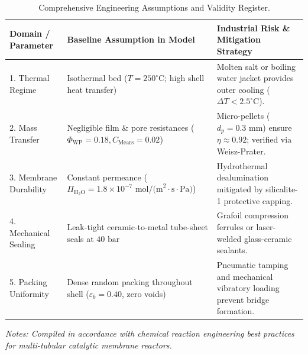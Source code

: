 \documentclass[12pt,a4paper]{article}
\begin{document}
\begin{table}[htbp]
\centering
\caption{Comprehensive Engineering Assumptions and Validity Register.}
\label{tab:assumptions}
\begin{tabular*}{\textwidth}{@{\extracolsep{\fill}}lll@{}}
\toprule
\textbf{Domain / Parameter} & \textbf{Baseline Assumption in Model} & \textbf{Industrial Risk \& Mitigation Strategy} \\
\midrule
1. Thermal Regime & Isothermal bed ($T = 250^\circ\text{C}$; high shell heat transfer) & Molten salt or boiling water jacket provides outer cooling ($\Delta T < 2.5^\circ\text{C}$). \\
2. Mass Transfer & Negligible film \& pore resistances ($\Phi_{\text{WP}} = 0.18, C_{\text{Mears}} = 0.02$) & Micro-pellets ($d_p = 0.3\text{ mm}$) ensure $\eta \approx 0.92$; verified via Weisz-Prater. \\
3. Membrane Durability & Constant permeance ($\Pi_{\text{H}_2\text{O}} = 1.8 \times 10^{-7}\text{ mol/(m}^2\cdot\text{s}\cdot\text{Pa)}$) & Hydrothermal dealumination mitigated by silicalite-1 protective capping. \\
4. Mechanical Sealing & Leak-tight ceramic-to-metal tube-sheet seals at $40\text{ bar}$ & Grafoil compression ferrules or laser-welded glass-ceramic sealants. \\
5. Packing Uniformity & Dense random packing throughout shell ($\varepsilon_b = 0.40$, zero voids) & Pneumatic tamping and mechanical vibratory loading prevent bridge formation. \\
\bottomrule
\end{tabular*}
\vspace{2pt}
{\raggedright\small\itshape Notes: Compiled in accordance with chemical reaction engineering best practices for multi-tubular catalytic membrane reactors.\par}
\end{table}

\end{document}
